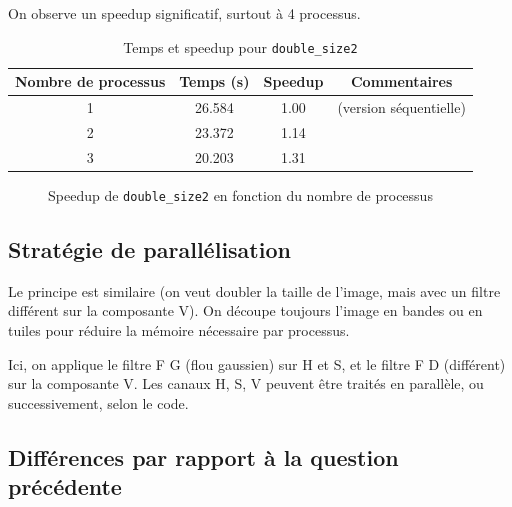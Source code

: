 \documentclass[a4paper,13pt]{book}
\begin{document}
On observe un speedup significatif, surtout à 4 processus.
\begin{table}[h!]
    \centering
    \caption{Temps et speedup pour \texttt{double\_size2}}
    \label{tab:double_size2}
    \begin{tabular}{@{}cccc@{}}
    \toprule
    \textbf{Nombre de processus} & \textbf{Temps (s)} & \textbf{Speedup} & \textbf{Commentaires}\\
    \midrule
    1 & 26.584 & 1.00 & (version séquentielle)\\
    2 & 23.372 & 1.14 & \\
    3 & 20.203 & 1.31 & \\
    \bottomrule
    \end{tabular}
    \end{table}
    
    \begin{figure}[h!]
    \centering
    \caption{Speedup de \texttt{double\_size2} en fonction du nombre de processus}
    \label{fig:double_size2_speedup}
    \end{figure}
    \subsection{Stratégie de parallélisation}

    Le principe est similaire (on veut doubler la taille de l’image, mais avec un filtre différent sur la composante V). On découpe toujours l’image en bandes ou en tuiles pour réduire la mémoire nécessaire par processus.
    
        Ici, on applique le filtre F G (flou gaussien) sur H et S, et le filtre F D (différent) sur la composante V.
        Les canaux H, S, V peuvent être traités en parallèle, ou successivement, selon le code.
    
    \subsection{Différences par rapport à la question précédente}
    
\end{document}
